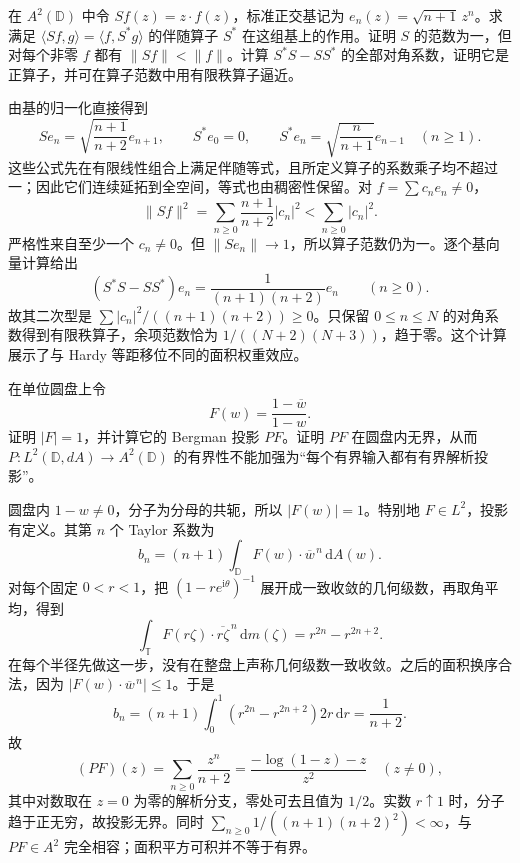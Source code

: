 \begin{exercise}\label{b3:ex:28-6}
在 \(A^2(\mathbb D)\) 中令 \(S f(z)=z\cdot f(z)\)，标准正交基记为 \(e_n(z)=\sqrt{n+1}\,z^n\)。求满足 \(\langle Sf,g\rangle=\langle f,S^*g\rangle\) 的伴随算子 \(S^*\) 在这组基上的作用。证明 \(S\) 的范数为一，但对每个非零 \(f\) 都有 \(\|Sf\|<\|f\|\)。计算 \(S^*S-SS^*\) 的全部对角系数，证明它是正算子，并可在算子范数中用有限秩算子逼近。
\end{exercise}
\begin{solution}
由基的归一化直接得到
\[
 Se_n=\sqrt{\frac{n+1}{n+2}}e_{n+1},\qquad
 S^*e_0=0,\qquad
 S^*e_n=\sqrt{\frac n{n+1}}e_{n-1}\quad(n\ge1).
\]
这些公式先在有限线性组合上满足伴随等式，且所定义算子的系数乘子均不超过一；因此它们连续延拓到全空间，等式也由稠密性保留。对 \(f=\sum c_ne_n\ne0\)，
\[
 \|Sf\|^2=\sum_{n\ge0}\frac{n+1}{n+2}|c_n|^2
 <\sum_{n\ge0}|c_n|^2.
\]
严格性来自至少一个 \(c_n\ne0\)。但 \(\|Se_n\|\to1\)，所以算子范数仍为一。逐个基向量计算给出
\[
 (S^*S-SS^*)e_n=\frac1{(n+1)(n+2)}e_n\qquad(n\ge0).
\]
故其二次型是 \(\sum |c_n|^2/((n+1)(n+2))\ge0\)。只保留 \(0\le n\le N\) 的对角系数得到有限秩算子，余项范数恰为 \(1/((N+2)(N+3))\)，趋于零。这个计算展示了与 Hardy 等距移位不同的面积权重效应。
\end{solution}

\begin{optionalexercise}\label{b3:ex:28-7}
在单位圆盘上令
\[
 F(w)=\frac{1-\overline w}{1-w}.
\]
证明 \(|F|=1\)，并计算它的 Bergman 投影 \(P F\)。证明 \(P F\) 在圆盘内无界，从而 \(P:L^2(\mathbb D,dA)\to A^2(\mathbb D)\) 的有界性不能加强为“每个有界输入都有有界解析投影”。
\end{optionalexercise}
\begin{solution}
圆盘内 \(1-w\ne0\)，分子为分母的共轭，所以 \(|F(w)|=1\)。特别地 \(F\in L^2\)，投影有定义。其第 \(n\) 个 Taylor 系数为
\[
 b_n=(n+1)\int_{\mathbb D}F(w)\cdot\overline w^{\,n}\,\mathrm dA(w).
\]
对每个固定 \(0<r<1\)，把 \((1-re^{\mathrm i\theta})^{-1}\) 展开成一致收敛的几何级数，再取角平均，得到
\[
 \int_{\mathbb T}F(r\zeta)\cdot\overline{r\zeta}^{\,n}\,\mathrm dm(\zeta)
 =r^{2n}-r^{2n+2}.
\]
在每个半径先做这一步，没有在整盘上声称几何级数一致收敛。之后的面积换序合法，因为 \(|F(w)\cdot\overline w^{\,n}|\le1\)。于是
\[
 b_n=(n+1)\int_0^1(r^{2n}-r^{2n+2})2r\,\mathrm dr
     =\frac1{n+2}.
\]
故
\[
 (P F)(z)=\sum_{n\ge0}\frac{z^n}{n+2}
 =\frac{-\log(1-z)-z}{z^2}\quad(z\ne0),
\]
其中对数取在 \(z=0\) 为零的解析分支，零处可去且值为 \(1/2\)。实数 \(r\uparrow1\) 时，分子趋于正无穷，故投影无界。同时 \(\sum_{n\ge0}1/((n+1)(n+2)^2)<\infty\)，与 \(P F\in A^2\) 完全相容；面积平方可积并不等于有界。
\end{solution}

